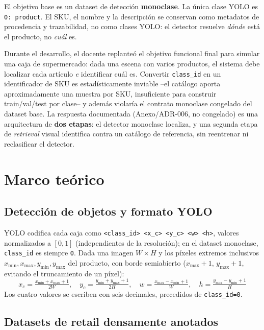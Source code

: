 \documentclass[10pt,a4paper]{article}
\begin{document}
El objetivo base es un dataset de detección \textbf{monoclase}. La única clase
YOLO es \texttt{0: product}. El SKU, el nombre y la descripción se conservan
como metadatos de procedencia y trazabilidad, no como clases YOLO: el detector
resuelve \emph{dónde} está el producto, no \emph{cuál} es.

Durante el desarrollo, el docente replanteó el objetivo funcional final para
simular una caja de supermercado: dada una escena con varios productos, el
sistema debe localizar cada artículo \emph{e} identificar cuál es. Convertir
\texttt{class\_id} en un identificador de SKU es estadísticamente inviable
--el catálogo aporta aproximadamente una muestra por SKU, insuficiente para
construir train/val/test por clase-- y además violaría el contrato monoclase
congelado del dataset base. La respuesta documentada (Anexo/ADR-006, no
congelado) es una arquitectura de \textbf{dos etapas}: el detector monoclase
localiza, y una segunda etapa de \emph{retrieval} visual identifica contra un
catálogo de referencia, sin reentrenar ni reclasificar el detector.

\section{Marco teórico}

\subsection{Detección de objetos y formato YOLO}

YOLO codifica cada caja como
\texttt{<class\_id> <x\_c> <y\_c> <w> <h>}, valores normalizados a $[0,1]$
(independientes de la resolución); en el dataset monoclase, \texttt{class\_id}
es siempre \texttt{0}. Dada una imagen $W\times H$ y los píxeles extremos
inclusivos $x_{\min},x_{\max},y_{\min},y_{\max}$ del producto, con borde
semiabierto ($x_{\max}+1$, $y_{\max}+1$, evitando el truncamiento de un
píxel):
\begin{equation}
x_c=\tfrac{x_{\min}+x_{\max}+1}{2W},\quad
y_c=\tfrac{y_{\min}+y_{\max}+1}{2H},\quad
w=\tfrac{x_{\max}-x_{\min}+1}{W},\quad
h=\tfrac{y_{\max}-y_{\min}+1}{H}
\label{eq:yolo}
\end{equation}
Los cuatro valores se escriben con seis decimales, precedidos de
\texttt{class\_id=0}.

\subsection{Datasets de retail densamente anotados}
\end{document}

